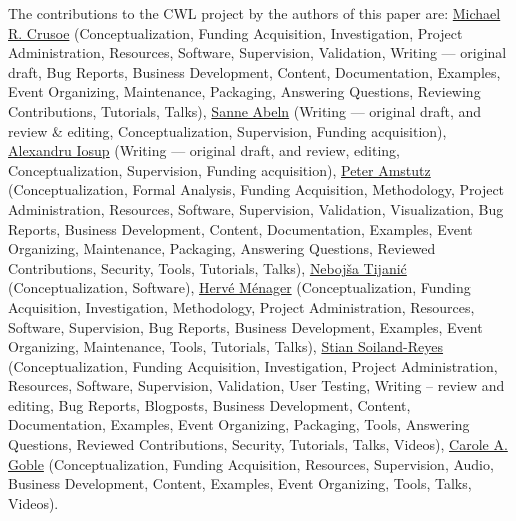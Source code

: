 \documentclass[sigconf,revew,screen,timestamp,nonacm]{acmart}
\newcommand{\contributor}[3]
{\normalsize\href{#1}{#2} \small(#3)\normalsize}
\begin{document}
\begin{acks}
The contributions to the CWL project by the authors of this paper are:
\contributor{https://orcid.org/0000-0002-2961-9670}{Michael R. Crusoe}{Conceptualization, Funding Acquisition, Investigation, Project Administration, Resources, Software, Supervision, Validation, Writing --- original draft, Bug Reports, Business Development, Content, Documentation, Examples, Event Organizing, Maintenance, Packaging, Answering Questions, Reviewing Contributions, Tutorials, Talks},
\contributor{https://orcid.org/0000-0002-2779-7174}{Sanne Abeln}{Writing --- original draft, and review \& editing, Conceptualization, Supervision, Funding acquisition},
\contributor{https://orcid.org/0000-0001-8030-9398}{Alexandru Iosup}{Writing --- original draft, and review, editing, Conceptualization, Supervision, Funding acquisition},
\contributor{https://orcid.org/0000-0003-3566-7705}{Peter Amstutz}{Conceptualization, Formal Analysis, Funding Acquisition, Methodology, Project Administration, Resources, Software, Supervision, Validation, Visualization, Bug Reports, Business Development, Content, Documentation, Examples, Event Organizing, Maintenance, Packaging, Answering Questions, Reviewed Contributions, Security, Tools, Tutorials, Talks},
\contributor{https://orcid.org/0000-0001-8316-4067}{Nebojša Tijanić}{Conceptualization, Software},
\contributor{https://orcid.org/0000-0002-7552-1009}{Hervé Ménager}{Conceptualization, Funding Acquisition, Investigation, Methodology, Project Administration, Resources, Software, Supervision, Bug Reports, Business Development, Examples, Event Organizing, Maintenance, Tools, Tutorials, Talks},
\contributor{https://orcid.org/0000-0001-9842-9718}{Stian Soiland-Reyes}{Conceptualization, Funding Acquisition, Investigation, Project Administration, Resources, Software, Supervision, Validation, User Testing, Writing – review and editing, Bug Reports, Blogposts, Business Development, Content, Documentation, Examples, Event Organizing, Packaging, Tools, Answering Questions, Reviewed Contributions, Security, Tutorials, Talks, Videos},
\contributor{https://orcid.org/0000-0003-1219-2137}{Carole A. Goble}{Conceptualization, Funding Acquisition, Resources, Supervision, Audio, Business Development, Content, Examples, Event Organizing, Tools, Talks, Videos}.


\end{acks}
\end{document}
